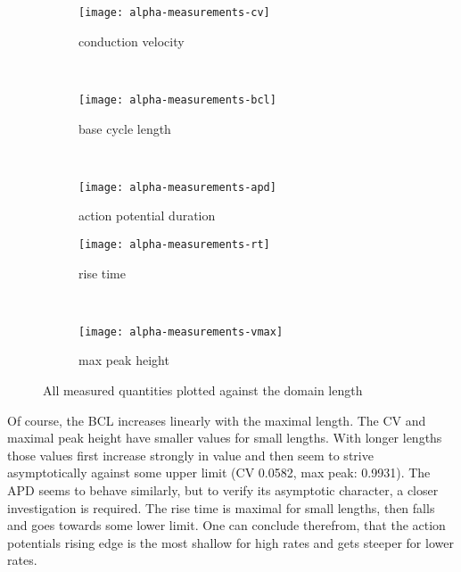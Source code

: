 \begin{figure}[h]
    \centering
    \begin{subfigure}[b]{.3\textwidth}
        \texttt{[image: alpha-measurements-cv]}
        \vspace{-\baselineskip}
        \label{fig:alpha-measure-cv}
        \caption{conduction velocity}
    \end{subfigure}
    \vspace{\baselineskip}
    ~
    \begin{subfigure}[b]{.3\textwidth}
        \texttt{[image: alpha-measurements-bcl]}
        \vspace{-\baselineskip}
        \label{fig:alpha-measure-bcl}
        \caption{base cycle length}
    \end{subfigure}
    ~
    \begin{subfigure}[b]{.3\textwidth}
        \texttt{[image: alpha-measurements-apd]}
        \vspace{-\baselineskip}
        \label{fig:alpha-measure-apd}
        \caption{action potential duration}
    \end{subfigure}
    \begin{subfigure}[b]{.3\textwidth}
        \texttt{[image: alpha-measurements-rt]}
        \vspace{-\baselineskip}
        \label{fig:alpha-measure-rt}
        \caption{rise time}
    \end{subfigure}
    ~
    \begin{subfigure}[b]{.3\textwidth}
        \texttt{[image: alpha-measurements-vmax]}
        \vspace{-\baselineskip}
        \label{fig:alpha-measure-vmax}
        \caption{max peak height}
    \end{subfigure}
    \label{fig:alpha2}
    \caption{All measured quantities plotted against the domain length}
\end{figure}

Of course, the BCL increases linearly with the maximal length.  The CV and
maximal peak height have smaller values for small lengths. With longer lengths
those values first increase strongly in value and then seem to strive
asymptotically against some upper limit (CV 0.0582, max peak: 0.9931).  The APD
seems to behave similarly, but to verify its asymptotic character, a closer
investigation is required.  The rise time is maximal for small lengths, then
falls and goes towards some lower limit. One can conclude therefrom, that the
action potentials rising edge is the most shallow for high rates and gets
steeper for lower rates.


